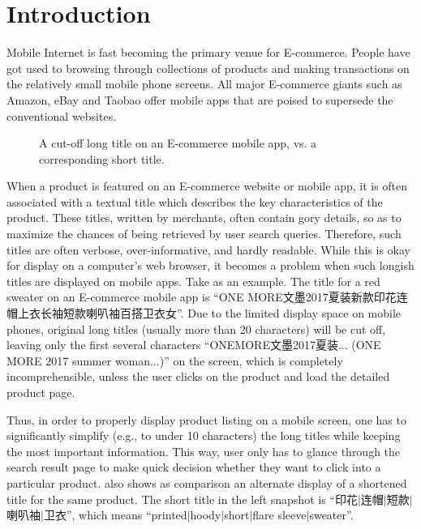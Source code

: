 \section{Introduction}

Mobile Internet is fast becoming the primary venue for E-commerce.
People have got used to browsing through collections of products and making
transactions on the relatively small mobile phone screens. 
All major E-commerce giants such as Amazon, 
eBay and Taobao offer mobile apps that are poised to supersede the conventional websites. 

\begin{figure}[th]
	\centering
	\caption{A cut-off long title on an E-commerce mobile app, vs. a corresponding
short title.}
	\label{fig:compare}
\end{figure}

When a product is featured on an E-commerce website or mobile app, it is often
associated with a textual title which describes the key characteristics of
the product. These titles, written by merchants,
often contain gory details, so as to maximize
the chances of being retrieved by user search queries.
Therefore, such titles are often verbose, over-informative, and hardly 
readable. 
While this is okay for display on a computer's web browser, it becomes a
problem when such longish titles are displayed on mobile apps.
Take  as an example. 
The title for a red sweater on an E-commerce mobile app is 
``ONE MORE文墨2017夏装新款印花连帽上衣长袖短款喇叭袖百搭卫衣女''.
Due to the limited display space on mobile phones, 
original long titles (usually more than 20 characters) will be cut off, 
leaving only the first several characters ``ONEMORE文墨2017夏装... 
(ONE MORE 2017 summer woman...)'' 
on the screen, which is completely incomprehensible, unless the user
clicks on the product and load the detailed product page.  

Thus, in order to properly display product listing on a mobile screen,
one has to significantly simplify (e.g., to under 10 characters) 
the long titles while keeping the most important information.
This way, user only has to glance through the search result page
to make quick decision whether they want to click into a particular 
product.
 also shows as comparison an alternate display
of a shortened title for the same product.
The short title in the left snapshot is ``印花$|$连帽$|$短款$|$喇叭袖$|$卫衣'',
which means ``printed$|$hoody$|$short$|$flare sleeve$|$sweater''. 

